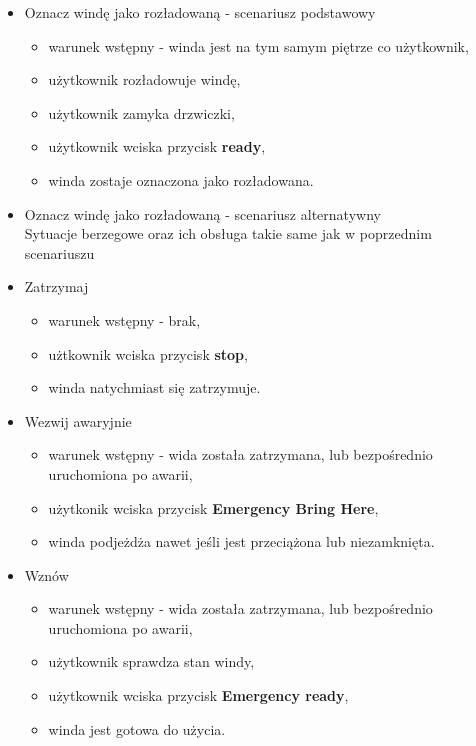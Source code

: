 \documentclass[a4paper,11pt]{article}
\begin{document}
\begin{itemize}
\begin{itemize}
		\end{itemize}
		\item Oznacz windę jako rozładowaną - scenariusz podstawowy
		\begin{itemize}
			\item warunek wstępny - winda jest na tym samym piętrze co użytkownik,
			\item użytkownik rozładowuje windę,
			\item użytkownik zamyka drzwiczki,
			\item użytkownik wciska przycisk \textbf{ready},
			\item winda zostaje oznaczona jako rozładowana.
		\end{itemize}
		\item Oznacz windę jako rozładowaną - scenariusz alternatywny \\
			Sytuacje berzegowe oraz ich obsługa takie same jak w poprzednim scenariuszu
		
		\item Zatrzymaj 
		\begin{itemize}
			\item warunek wstępny - brak,
			\item użtkownik wciska przycisk \textbf{stop},
			\item winda natychmiast się zatrzymuje.
		\end{itemize}
		
		\item Wezwij awaryjnie
		\begin{itemize}
			\item warunek wstępny - wida została zatrzymana, lub bezpośrednio uruchomiona po awarii,
			\item użytkonik wciska przycisk \textbf{Emergency Bring Here},
			\item winda podjeżdża nawet jeśli jest przeciążona lub niezamknięta.
		\end{itemize}
		
		\item Wznów
		\begin{itemize}
			\item warunek wstępny - wida została zatrzymana, lub bezpośrednio uruchomiona po awarii,
			\item użytkownik sprawdza stan windy,
			\item użytkownik wciska przycisk \textbf{Emergency ready},
			\item winda jest gotowa do użycia.
		\end{itemize}
		
	\end{itemize}
    
\end{document}
